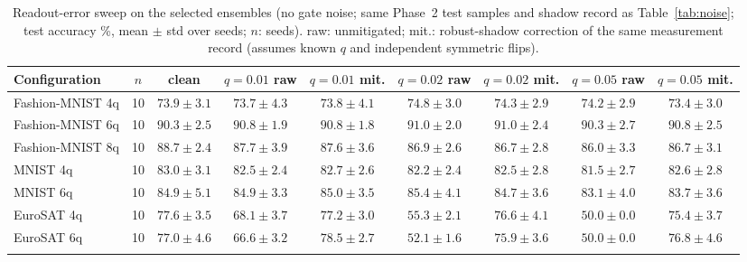 \begin{table}[t]
\caption{Readout-error sweep on the selected ensembles (no gate noise; same Phase~2 test samples and shadow record as Table~\ref{tab:noise}; test accuracy \%, mean $\pm$ std over seeds; $n$: seeds). raw: unmitigated; mit.: robust-shadow correction of the same measurement record (assumes known $q$ and independent symmetric flips).}\label{tab:readout-sweep}
\footnotesize\setlength\tabcolsep{3pt}
\begin{tabular}{@{}lcccccccc@{}}
\toprule
Configuration & $n$ & clean & $q=0.01$ raw & $q=0.01$ mit. & $q=0.02$ raw & $q=0.02$ mit. & $q=0.05$ raw & $q=0.05$ mit. \\
\midrule
Fashion-MNIST 4q & 10 & $73.9\pm3.1$ & $73.7\pm4.3$ & $73.8\pm4.1$ & $74.8\pm3.0$ & $74.3\pm2.9$ & $74.2\pm2.9$ & $73.4\pm3.0$ \\
Fashion-MNIST 6q & 10 & $90.3\pm2.5$ & $90.8\pm1.9$ & $90.8\pm1.8$ & $91.0\pm2.0$ & $91.0\pm2.4$ & $90.3\pm2.7$ & $90.8\pm2.5$ \\
Fashion-MNIST 8q & 10 & $88.7\pm2.4$ & $87.7\pm3.9$ & $87.6\pm3.6$ & $86.9\pm2.6$ & $86.7\pm2.8$ & $86.0\pm3.3$ & $86.7\pm3.1$ \\
MNIST 4q & 10 & $83.0\pm3.1$ & $82.5\pm2.4$ & $82.7\pm2.6$ & $82.2\pm2.4$ & $82.5\pm2.8$ & $81.5\pm2.7$ & $82.6\pm2.8$ \\
MNIST 6q & 10 & $84.9\pm5.1$ & $84.9\pm3.3$ & $85.0\pm3.5$ & $85.4\pm4.1$ & $84.7\pm3.6$ & $83.1\pm4.0$ & $83.7\pm3.6$ \\
EuroSAT 4q & 10 & $77.6\pm3.5$ & $68.1\pm3.7$ & $77.2\pm3.0$ & $55.3\pm2.1$ & $76.6\pm4.1$ & $50.0\pm0.0$ & $75.4\pm3.7$ \\
EuroSAT 6q & 10 & $77.0\pm4.6$ & $66.6\pm3.2$ & $78.5\pm2.7$ & $52.1\pm1.6$ & $75.9\pm3.6$ & $50.0\pm0.0$ & $76.8\pm4.6$ \\
\botrule
\end{tabular}
\end{table}
